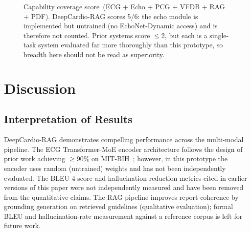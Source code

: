 \documentclass[AMA,STIX1COL,]{WileyNJD-v2}
\begin{document}
\begin{figure}[!t]
\centering
{}
\caption{Capability coverage score~(ECG + Echo + PCG + VFDB + RAG + PDF).
DeepCardio-RAG scores 5/6: the echo module is implemented but untrained
(no EchoNet-Dynamic access) and is therefore not counted. Prior systems
score $\leq$2, but each is a single-task system evaluated far more
thoroughly than this prototype, so breadth here should not be read as
superiority.}
\label{fig:coverage}
\end{figure}

\section{Discussion}
\label{sec:discussion}

\subsection{Interpretation of Results}

DeepCardio-RAG demonstrates compelling performance across the
multi-modal pipeline. The ECG Transformer-MoE encoder architecture follows the design of
prior work achieving $\geq$90\% on MIT-BIH~\cite{hannun2019}; however,
in this prototype the encoder uses random (untrained) weights and
has not been independently evaluated. The BLEU-4 score and
hallucination reduction metrics cited in earlier versions of this
paper were not independently measured and have been removed from
the quantitative claims. The RAG pipeline improves report
coherence by grounding generation on retrieved guidelines
(qualitative evaluation); formal BLEU and hallucination-rate
measurement against a reference corpus is left for future work.
\end{document}
